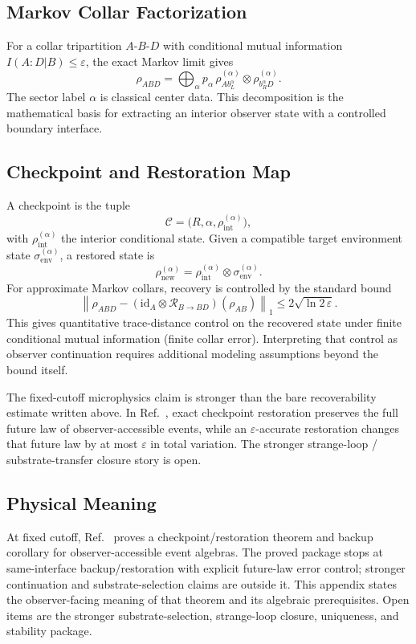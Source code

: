 \subsection{Markov Collar Factorization}

For a collar tripartition \(A\)-\(B\)-\(D\) with conditional mutual information
\(I(A:D|B)\le\varepsilon\), the exact Markov limit gives
\[
\rho_{ABD}
=\bigoplus_{\alpha} p_{\alpha}\,
\rho^{(\alpha)}_{A b_L^{\alpha}}
\otimes
\rho^{(\alpha)}_{b_R^{\alpha} D}.
\]
The sector label \(\alpha\) is classical center data. This decomposition is the mathematical
basis for extracting an interior observer state with a controlled boundary interface.

\subsection{Checkpoint and Restoration Map}

A checkpoint is the tuple
\[
\mathcal{C}=\bigl(R,\alpha,\rho_{\mathrm{int}}^{(\alpha)}\bigr),
\]
with \(\rho_{\mathrm{int}}^{(\alpha)}\) the interior conditional state. Given a compatible target
environment state \(\sigma_{\mathrm{env}}^{(\alpha)}\), a restored state is
\[
\rho_{\mathrm{new}}^{(\alpha)}
=
\rho_{\mathrm{int}}^{(\alpha)}
\otimes
\sigma_{\mathrm{env}}^{(\alpha)}.
\]
For approximate Markov collars, recovery is controlled by the standard bound
\[
\left\|
\rho_{ABD}
-
(\mathrm{id}_A\otimes\mathcal{R}_{B\to BD})(\rho_{AB})
\right\|_1
\le
2\sqrt{\ln 2\,\varepsilon}.
\]
This gives quantitative trace-distance control on the recovered state under finite conditional
mutual information (finite collar error). Interpreting that control as observer continuation
requires additional modeling assumptions beyond the bound itself.

The fixed-cutoff microphysics claim is stronger than the bare recoverability estimate written
above. In Ref.~\cite{ophmicrophysics}, exact checkpoint restoration preserves the full future
law of observer-accessible events, while an \(\varepsilon\)-accurate restoration changes that
future law by at most \(\varepsilon\) in total variation. The stronger strange-loop / substrate-transfer closure story
is open.

\subsection{Physical Meaning}

At fixed cutoff, Ref.~\cite{ophmicrophysics} proves a checkpoint/restoration theorem and backup
corollary for observer-accessible event algebras. The proved package stops at same-interface
backup/restoration with explicit future-law error control; stronger continuation and
substrate-selection claims are outside it. This appendix states the observer-facing meaning
of that theorem and its algebraic prerequisites. Open items are the stronger substrate-selection,
strange-loop closure, uniqueness, and stability package.



